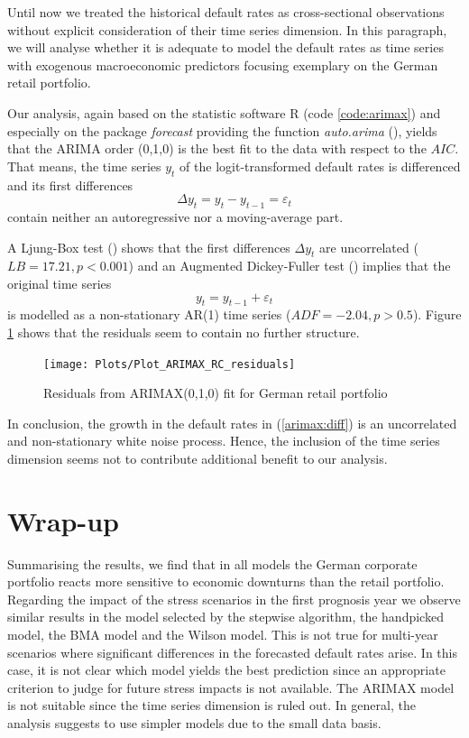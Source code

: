 \documentclass[a4paper, 12pt]{scrreprt}
\begin{document}
Until now we treated the historical default rates as cross-sectional observations without explicit consideration of their time series dimension. In this paragraph, we will analyse whether it is adequate to model the default rates as time series with exogenous macroeconomic predictors focusing exemplary on the German retail portfolio.


Our analysis, again based on the statistic software R (code \ref{code:arimax}) and especially on the package \textit{forecast} providing the function \textit{auto.arima} (\textcite{hyndman2017forecast}), yields that the ARIMA order (0,1,0) is the best fit to the data with respect to the $AIC$.
That means, the time series $y_t$ of the logit-transformed default rates is differenced and its first differences 
\begin{equation}
\Delta y_t = y_t - y_{t-1} = \varepsilon_t
\end{equation}
contain neither an autoregressive nor a moving-average part.

A Ljung-Box test (\textcite{ljung1978measure}) shows that the first differences $\Delta y_t$ are uncorrelated ($LB = 17.21, p< 0.001$) and an Augmented Dickey-Fuller test
(\textcite{dickey1979distribution}) implies that the original time series 
\begin{equation}\label{arimax:diff}
y_t = y_{t-1} + \varepsilon_t
\end{equation}
is modelled as a non-stationary AR(1) time series ($ADF = -2.04, p > 0.5$). 
Figure \ref{plot:ARIMAX_RC_residuals} shows that the residuals seem to contain no further structure.

\begin{figure}[H]
	\texttt{[image: Plots/Plot\_ARIMAX\_RC\_residuals]}
	\centering
	\caption{Residuals from ARIMAX(0,1,0) fit for German retail portfolio}
	\label{plot:ARIMAX_RC_residuals}
\end{figure}

\bigskip

In conclusion, the growth in the default rates in (\ref{arimax:diff}) is an uncorrelated and non-stationary white noise process. Hence, the inclusion of the time series dimension seems not to contribute additional benefit to our analysis.

\section{Wrap-up}

Summarising the results, we find that in all models the German corporate portfolio reacts more sensitive to economic downturns than the retail portfolio. Regarding the impact of the stress scenarios in the first prognosis year we observe similar results in the model selected by the stepwise algorithm, the handpicked model, the BMA model and the Wilson model. This is not true for multi-year scenarios where significant differences in the forecasted default rates arise.
In this case, it is not clear which model yields the best prediction since an appropriate criterion to judge for future stress impacts is not available.
The ARIMAX model is not suitable since the time series dimension is ruled out.
In general, the analysis suggests to use simpler models due to the small data basis.
\end{document}
